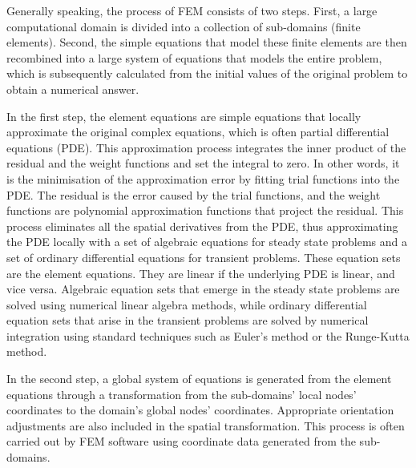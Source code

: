 Generally speaking, the process of FEM consists of two steps. First, a large computational domain is divided into a collection of sub-domains (finite elements). Second, the simple equations that model these finite elements are then recombined into a large system of equations that models the entire problem, which is subsequently calculated from the initial values of the original problem to obtain a numerical answer. \cite{aboutfem2016}



In the first step, the element equations are simple equations that locally approximate the original complex equations, which is often partial differential equations (PDE). This approximation process integrates the inner product of the residual and the weight functions and set the integral to zero. In other words, it is the minimisation of the approximation error by fitting trial functions into the PDE. The residual is the error caused by the trial functions, and the weight functions are polynomial approximation functions that project the residual. This process eliminates all the spatial derivatives from the PDE, thus approximating the PDE locally with a set of algebraic equations for steady state problems and a set of ordinary differential equations for transient problems. These equation sets are the element equations. They are linear if the underlying PDE is linear, and vice versa. Algebraic equation sets that emerge in the steady state problems are solved using numerical linear algebra methods, while ordinary differential equation sets that arise in the transient problems are solved by numerical integration using standard techniques such as Euler's method or the Runge-Kutta method. \cite{aboutfem2016}

In the second step, a global system of equations is generated from the element equations through a transformation from the sub-domains' local nodes' coordinates to the domain's global nodes' coordinates. Appropriate orientation adjustments are also included in the spatial transformation. This process is often carried out by FEM software using coordinate data generated from the sub-domains. \cite{aboutfem2016}




